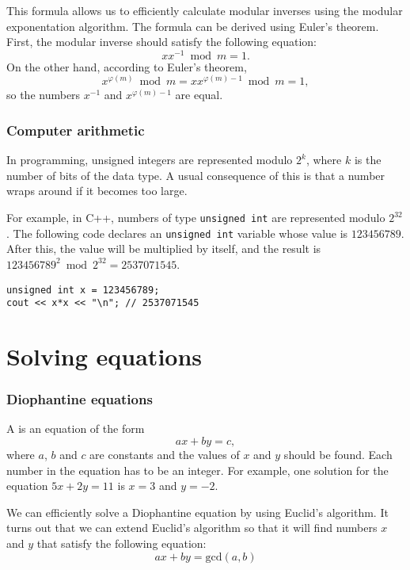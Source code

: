This formula allows us to efficiently calculate
modular inverses using the modular exponentation algorithm.
The formula can be derived using Euler's theorem.
First, the modular inverse should satisfy the following equation:
\[
x x^{-1} \bmod m = 1.
\]
On the other hand, according to Euler's theorem,
\[
x^{\varphi(m)} \bmod m =  xx^{\varphi(m)-1} \bmod m = 1,
\]
so the numbers $x^{-1}$ and $x^{\varphi(m)-1}$ are equal.

\subsubsection{Computer arithmetic}

In programming, unsigned integers are represented modulo $2^k$,
where $k$ is the number of bits of the data type.
A usual consequence of this is that a number wraps around
if it becomes too large.

For example, in C++, numbers of type \texttt{unsigned int}
are represented modulo $2^{32}$.
The following code declares an \texttt{unsigned int}
variable whose value is $123456789$.
After this, the value will be multiplied by itself,
and the result is
$123456789^2 \bmod 2^{32} = 2537071545$.

\begin{lstlisting}
unsigned int x = 123456789;
cout << x*x << "\n"; // 2537071545
\end{lstlisting}

\section{Solving equations}

\subsubsection*{Diophantine equations}


A 
is an equation of the form
\[ ax + by = c, \]
where $a$, $b$ and $c$ are constants
and the values of $x$ and $y$ should be found.
Each number in the equation has to be an integer.
For example, one solution for the equation
$5x+2y=11$ is $x=3$ and $y=-2$.


We can efficiently solve a Diophantine equation
by using Euclid's algorithm.
It turns out that we can extend Euclid's algorithm
so that it will find numbers $x$ and $y$
that satisfy the following equation:
\[
ax + by = \textrm{gcd}(a,b)
\]

